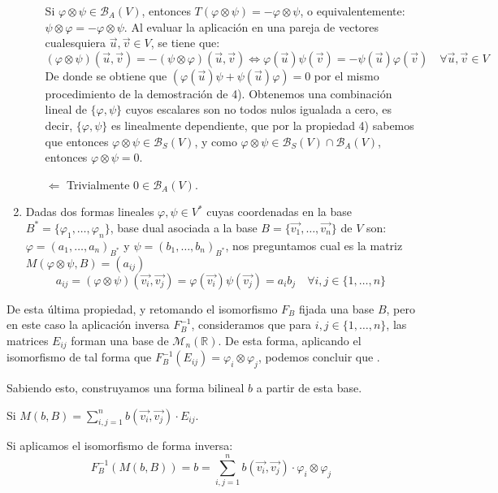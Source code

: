 \documentclass[x11names,table]{report}
\begin{document}
\begin{enumerate}
\begin{itemize}
Si $\varphi\otimes\psi\in\mathcal{B}_A(V)$, entonces  $T(\varphi\otimes\psi)=-\varphi\otimes\psi$, o equivalentemente: $\psi\otimes\varphi=-\varphi\otimes\psi$. Al evaluar la aplicación en una pareja de vectores cualesquiera $\vec{u},\vec{v}\in V$, se tiene que:
\[(\varphi\otimes\psi)(\vec{u},\vec{v})=-(\psi\otimes\varphi)(\vec{u},\vec{v})\Leftrightarrow\varphi(\vec{u})\psi(\vec{v})=-\psi(\vec{u})\varphi(\vec{v})\quad\forall\vec{u},\vec{v}\in V\]
De donde se obtiene que  $(\varphi(\vec{u})\psi+\psi(\vec{u})\varphi)=0$ por el mismo procedimiento de la demostración de 4). Obtenemos una combinación lineal de $\{\varphi,\psi\}$ cuyos escalares son no todos nulos igualada a cero, es decir, $\{\varphi,\psi\}$ es linealmente dependiente, que por la propiedad 4) sabemos que entonces $\varphi\otimes\psi\in\mathcal{B}_S(V)$, y como $\varphi\otimes\psi\in\mathcal{B}_S(V)\cap\mathcal{B}_A(V)$, entonces $\varphi\otimes\psi=0$.
\item[$\Leftarrow$] Trivialmente $0\in\mathcal{B}_A(V)$.

\end{itemize}
\item

Dadas dos formas lineales $\varphi,\psi\in V^*$ cuyas coordenadas en la base $B^*=\{\varphi_1,\dots,\varphi_n\}$, base dual asociada a la base $B=\{\vec{v_1},\dots,\vec{v_n}\}$ de $V$ son: $\varphi=(a_1,\dots,a_n)_{B^*}$ y $\psi=(b_1,\dots,b_n)_{B^*}$, nos preguntamos cual es la matriz $M(\varphi\otimes\psi, B)=(a_{ij})$
\[a_{ij}=(\varphi\otimes\psi)(\vec{v_i},\vec{v_j})=\varphi(\vec{v_i})\psi(\vec{v_j})=a_ib_j\quad\forall i,j\in\{1,\dots,n\}\]
\end{enumerate}


De esta última propiedad, y retomando el isomorfismo $F_B$ fijada una base $B$, pero en este caso la aplicación inversa $F_B^{-1}$, consideramos que para $i,j\in\{1,\dots,n\}$, las matrices $E_{ij}$ forman una base de $\mathcal{M}_n(\mathbb{R})$. De esta forma, aplicando el isomorfismo de tal forma que $F_B^{-1}(E_{ij})=\varphi_i\otimes\varphi_j$, podemos concluir que .

Sabiendo esto, construyamos una forma bilineal $b$ a partir de esta base.

Si $M(b,B)=\sum_{i,j=1}^n b(\vec{v_i},\vec{v_j})\cdot E_{ij}$.

Si aplicamos el isomorfismo de forma inversa:
\[F_B^{-1}(M(b,B))=b=\sum_{i,j=1}^n b(\vec{v_i},\vec{v_j})\cdot \varphi_i\otimes\varphi_j\]
\end{document}
